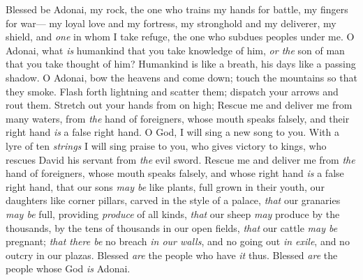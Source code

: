 \begin{biblechapter} %
 Blessed be Adonai, my rock, 
the one who trains my hands for battle, 
my fingers for war—
\verse my loyal love and my fortress, 
my stronghold and my deliverer, 
my shield, and \textit{one} in whom I take refuge, 
the one who subdues peoples under me.
\verse O Adonai, what \textit{is} humankind that you take knowledge of him, 
\textit{or the} son of man that you take thought of him?
\verse Humankind is like a breath, 
his days like a passing shadow.
\verse O Adonai, bow the heavens and come down; 
touch the mountains so that they smoke.
\verse Flash forth lightning and scatter them; 
dispatch your arrows and rout them.
\verse Stretch out your hands from on high; 
Rescue me and deliver me from many waters, 
from \textit{the} hand of foreigners,
\verse whose mouth speaks falsely, 
and their right hand \textit{is} a false right hand.
\verse O God, I will sing a new song to you. 
With a lyre of ten \textit{strings} I will sing praise to you,
\verse who gives victory to kings, 
who rescues David his servant 
from \textit{the} evil sword.
\verse Rescue me and deliver me 
from \textit{the} hand of foreigners, 
whose mouth speaks falsely, 
and whose right hand \textit{is} a false right hand,
\verse that our sons \textit{may be} like plants, 
full grown in their youth, 
our daughters like corner pillars, 
carved in the style of a palace,
\verse \textit{that} our granaries \textit{may be} full, 
providing \textit{produce} of all kinds, 
\textit{that} our sheep \textit{may} produce by the thousands, 
by the tens of thousands in our open fields,
\verse \textit{that} our cattle \textit{may be} pregnant; 
\textit{that there be} no breach \textit{in our walls}, 
and no going out \textit{in exile}, 
and no outcry in our plazas.
\verse Blessed \textit{are} the people who have \textit{it} thus. 
Blessed \textit{are} the people whose God \textit{is} Adonai.
\end{biblechapter}

